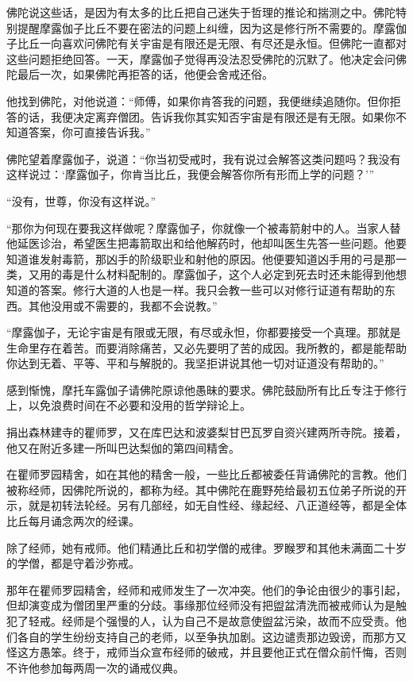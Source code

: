 \documentclass[12pt,twoside,openany]{book}
\begin{document}
佛陀说这些话，是因为有太多的比丘把自己迷失于哲理的推论和揣测之中。佛陀特别提醒摩露伽子比丘不要在密法的问题上纠缠，因为这是修行所不需要的。摩露伽子比丘一向喜欢问佛陀有关宇宙是有限还是无限、有尽还是永恒。但佛陀一直都对这些问题拒绝回答。一天，摩露伽子觉得再没法忍受佛陀的沉默了。他决定会问佛陀最后一次，如果佛陀再拒答的话，他便会舍戒还俗。

他找到佛陀，对他说道：“师傅，如果你肯答我的问题，我便继续追随你。但你拒答的话，我便决定离弃僧团。告诉我你其实知否宇宙是有限还是有无限。如果你不知道答案，你可直接告诉我。”

佛陀望着摩露伽子，说道：“你当初受戒时，我有说过会解答这类问题吗？我没有这样说过：‘摩露伽子，你肯当比丘，我便会解答你所有形而上学的问题？’”

“没有，世尊，你没有这样说。”

“那你为何现在要我这样做呢？摩露伽子，你就像一个被毒箭射中的人。当家人替他延医诊治，希望医生把毒箭取出和给他解药时，他却叫医生先答一些问题。他要知道谁发射毒箭，那凶手的阶级职业和射他的原因。他便要知道凶手用的弓是那一类，又用的毒是什么材料配制的。摩露伽子，这个人必定到死去时还未能得到他想知道的答案。修行大道的人也是一样。我只会教一些可以对修行证道有帮助的东西。其他没用或不需要的，我都不会说教。”

“摩露伽子，无论宇宙是有限或无限，有尽或永怛，你都要接受一个真理。那就是生命里存在着苦。而要消除痛苦，又必先要明了苦的成因。我所教的，都是能帮助你达到无着、平等、平和与解脱的。我坚拒讲说其他一切对证道没有帮助的。”

感到惭愧，摩托车露伽子请佛陀原谅他愚昧的要求。佛陀鼓励所有比丘专注于修行上，以免浪费时间在不必要和没用的哲学辩论上。

捐出森林建寺的瞿师罗，又在库巴达和波婆梨甘巴瓦罗自资兴建两所寺院。接着，他又在附近多建一所叫巴达梨伽的第四间精舍。

在瞿师罗园精舍，如在其他的精舍一般，一些比丘都被委任背诵佛陀的言教。他们被称经师，因佛陀所说的，都称为经。其中佛陀在鹿野苑给最初五位弟子所说的开示，就是初转法轮经。另有几部经，如无自性经、缘起经、八正道经等，都是全体比丘每月诵念两次的经课。

除了经师，她有戒师。他们精通比丘和初学僧的戒律。罗睺罗和其他未满面二十岁的学僧，都是守着沙弥戒。

那年在瞿师罗园精舍，经师和戒师发生了一次冲突。他们的争论由很少的事引起，但却演变成为僧团里严重的分歧。事缘那位经师没有把盥盆清洗而被戒师认为是触犯了轻戒。经师是个强慢的人，认为自己不是故意使盥盆污染，故而不应受责。他们各自的学生纷纷支持自己的老师，以至争执加剧。这边谴责那边毁谤，而那方又怪这方愚笨。终于，戒师当众宣布经师的破戒，并且要他正式在僧众前忏悔，否则不许他参加每两周一次的诵戒仪典。
\end{document}
